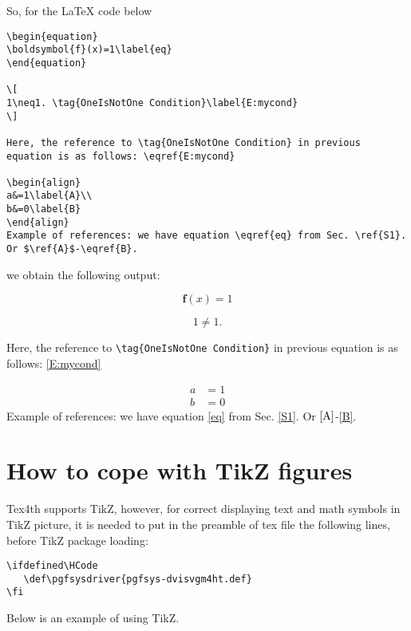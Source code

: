 \documentclass{article}
\def\pgfsysdriver{pgfsys-dvisvgm4ht.def}
\begin{document}
So, for the \LaTeX{} code below
{\small
\begin{verbatim}
\begin{equation}
\boldsymbol{f}(x)=1\label{eq}
\end{equation}

\[
1\neq1. \tag{OneIsNotOne Condition}\label{E:mycond}
\]

Here, the reference to \tag{OneIsNotOne Condition} in previous
equation is as follows: \eqref{E:mycond}

\begin{align}
a&=1\label{A}\\
b&=0\label{B}
\end{align}
Example of references: we have equation \eqref{eq} from Sec. \ref{S1}. Or $\ref{A}$-\eqref{B}.
\end{verbatim}}
\noindent we obtain the following output:

\begin{equation}
\boldsymbol{f}(x)=1\label{eq}
\end{equation}

\[
1\neq1. \tag{OneIsNotOne Condition}\label{E:mycond}
\]

Here, the reference to \verb|\tag{OneIsNotOne Condition}| in previous
equation is as follows: \eqref{E:mycond}

\begin{align}
a&=1\label{A}\\
b&=0\label{B}
\end{align}
Example of references: we have equation \eqref{eq} from Sec. \ref{S1}. Or
$\ref{A}$-\eqref{B}.

\section{How to cope with TikZ figures}\label{S3}
Tex4th supports TikZ, however, for correct displaying text and math symbols
in TikZ picture, it is needed to put in the preamble of tex file the
following lines, before TikZ package loading:
\begin{verbatim}
\ifdefined\HCode
   \def\pgfsysdriver{pgfsys-dvisvgm4ht.def}
\fi
\end{verbatim}

Below is an example of using TikZ.
\end{document}
